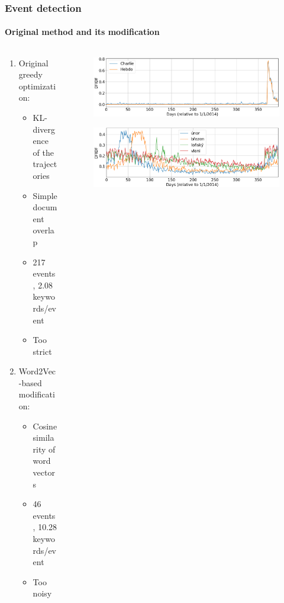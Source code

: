 \documentclass{beamer}
\begin{document}
\begin{frame}
\frametitle{Event detection}
\framesubtitle{Original method and its modification}

\begin{columns}

\begin{column}{0.45\textwidth}
\begin{enumerate}

\item Original greedy optimization:
\begin{itemize}
\item KL-divergence of the trajectories
\item Simple document overlap
\item 217 events, 2.08 keywords/event
\item Too strict
\end{itemize}

\item Word2Vec-based modification:
\begin{itemize}
\item Cosine similarity of word vectors
\item 46 events, 10.28 keywords/event
\item Too noisy
\end{itemize}

\end{enumerate}
\end{column}

\begin{column}{0.55\textwidth}
\begin{figure}
\centering
\includegraphics[width=\linewidth,height=\textheight,keepaspectratio]{charlie_hebdo_sucky_quality}
\end{figure}

\begin{figure}
\centering
\includegraphics[width=\linewidth,height=\textheight,keepaspectratio]{greedy_sucks}
\end{figure}
\end{column}

\end{columns}

\end{frame}
\end{document}
